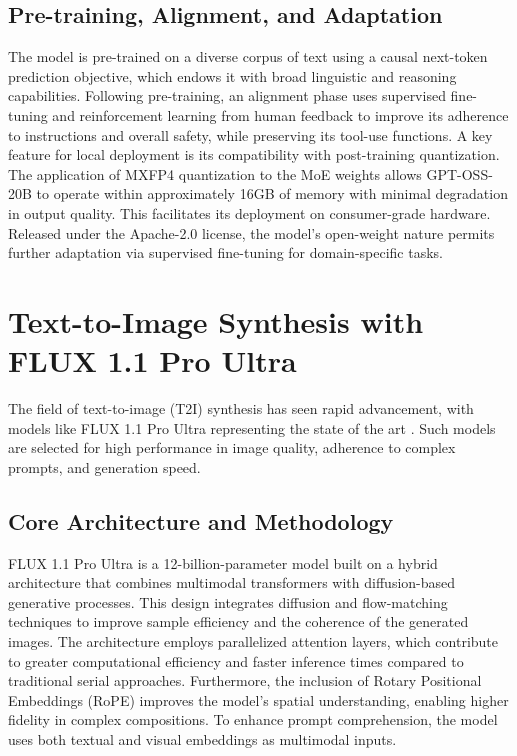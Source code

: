 \subsection{Pre-training, Alignment, and Adaptation}
The model is pre-trained on a diverse corpus of text using a causal next-token prediction objective, which endows it with broad linguistic and reasoning capabilities. Following pre-training, an alignment phase uses supervised fine-tuning and reinforcement learning from human feedback to improve its adherence to instructions and overall safety, while preserving its tool-use functions. A key feature for local deployment is its compatibility with post-training quantization. The application of MXFP4 quantization to the MoE weights allows GPT-OSS-20B to operate within approximately 16GB of memory with minimal degradation in output quality. This facilitates its deployment on consumer-grade hardware. Released under the Apache-2.0 license, the model's open-weight nature permits further adaptation via supervised fine-tuning for domain-specific tasks.

\section{Text-to-Image Synthesis with FLUX 1.1 Pro Ultra}
\label{sec:background_t2i}
The field of text-to-image (T2I) synthesis has seen rapid advancement, with models like FLUX 1.1 Pro Ultra representing the state of the art \cite{blackforestlabs2024flux}. Such models are selected for high performance in image quality, adherence to complex prompts, and generation speed.

\subsection{Core Architecture and Methodology}
FLUX 1.1 Pro Ultra is a 12-billion-parameter model built on a hybrid architecture that combines multimodal transformers with diffusion-based generative processes. This design integrates diffusion and flow-matching techniques to improve sample efficiency and the coherence of the generated images. The architecture employs parallelized attention layers, which contribute to greater computational efficiency and faster inference times compared to traditional serial approaches. Furthermore, the inclusion of Rotary Positional Embeddings (RoPE) improves the model's spatial understanding, enabling higher fidelity in complex compositions. To enhance prompt comprehension, the model uses both textual and visual embeddings as multimodal inputs.


